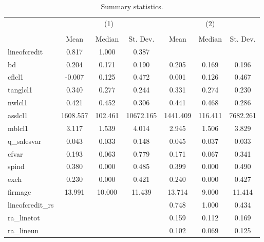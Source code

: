 \begin{table}[htbp]\centering
\def\sym#1{\ifmmode^{#1}\else\(^{#1}\)\fi}
\caption{Summary statistics.}
\begin{tabular}{l*{2}{ccc}}
\hline\hline
            &\multicolumn{3}{c}{(1)}               &\multicolumn{3}{c}{(2)}               \\
            &\multicolumn{3}{c}{}                  &\multicolumn{3}{c}{}                  \\
            &        Mean&      Median&    St. Dev.&        Mean&      Median&    St. Dev.\\
\hline
lineofcredit&       0.817&       1.000&       0.387&            &            &            \\
bd          &       0.204&       0.171&       0.190&       0.205&       0.169&       0.196\\
cflcl1      &      -0.007&       0.125&       0.472&       0.001&       0.126&       0.467\\
tanglcl1    &       0.340&       0.277&       0.244&       0.331&       0.274&       0.230\\
nwlcl1      &       0.421&       0.452&       0.306&       0.441&       0.468&       0.286\\
asslcl1     &    1608.557&     102.461&   10672.165&    1441.409&     116.411&    7682.261\\
mblcl1      &       3.117&       1.539&       4.014&       2.945&       1.506&       3.829\\
q\_salesvar  &       0.043&       0.033&       0.148&       0.045&       0.037&       0.033\\
cfvar       &       0.193&       0.063&       0.779&       0.171&       0.067&       0.341\\
spind       &       0.380&       0.000&       0.485&       0.399&       0.000&       0.490\\
exch        &       0.230&       0.000&       0.421&       0.240&       0.000&       0.427\\
firmage     &      13.991&      10.000&      11.439&      13.714&       9.000&      11.414\\
lineofcredit\_rs&            &            &            &       0.748&       1.000&       0.434\\
ra\_linetot  &            &            &            &       0.159&       0.112&       0.169\\
ra\_lineun   &            &            &            &       0.102&       0.069&       0.125\\

\end{tabular}
\end{table}
